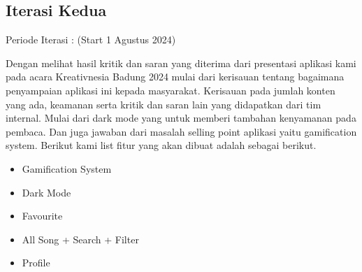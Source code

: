 \subsection{Iterasi Kedua}
Periode Iterasi : (Start 1 Agustus 2024)

Dengan melihat hasil kritik dan saran yang diterima dari presentasi aplikasi kami pada acara
Kreativnesia Badung 2024 mulai dari kerisauan tentang bagaimana penyampaian aplikasi ini kepada masyarakat.
Kerisauan pada jumlah konten yang ada, keamanan serta kritik dan saran lain yang didapatkan dari tim internal.
Mulai dari dark mode yang untuk memberi tambahan kenyamanan pada pembaca. Dan juga jawaban dari masalah
selling point aplikasi yaitu gamification system. Berikut kami list fitur yang akan dibuat adalah sebagai
berikut.

\begin{itemize}
    \item Gamification System
    \item Dark Mode
    \item Favourite
    \item All Song + Search + Filter
    \item Profile
\end{itemize}

